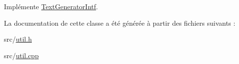 Implémente \hyperlink{class_text_generator_intf_a246866c847ad919b03a0178fadd43657}{Text\+Generator\+Intf}.



La documentation de cette classe a été générée à partir des fichiers suivants \+:\begin{DoxyCompactItemize}
\item 
src/\hyperlink{util_8h}{util.\+h}\item 
src/\hyperlink{util_8cpp}{util.\+cpp}\end{DoxyCompactItemize}
